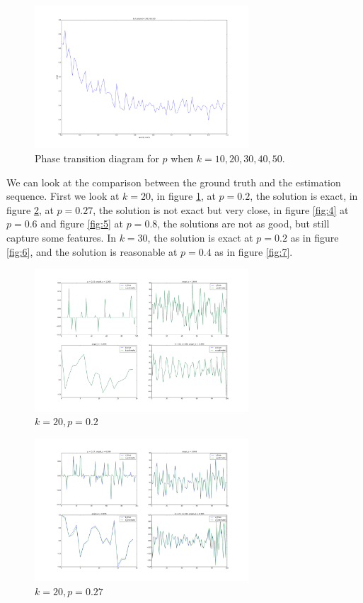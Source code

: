\documentclass[letter, 10pt]{article}
\numberwithin{equation}{section}
\begin{document}
\begin{figure}
\includegraphics[width=8cm,keepaspectratio]{fig2/w_Norm_x_BerNorm_A_none_n100_k50_p__sigma0_00.png}
\caption{ Phase transition diagram for $p$ when $k=10, 20, 30, 40, 50$. }
\end{figure}

We can look at the comparison between the ground truth and the estimation sequence.  First we look at $k=20$, in figure \ref{fig:2}, at $p=0.2$,  the solution is exact, in figure \ref{fig:3}, at $p=0.27$, the solution is not exact but very close, in figure \ref{fig:4} at $p=0.6$ and figure \ref{fig:5} at $p=0.8$, the solutions are not as good, but still capture some features. 
In $k=30$, the solution is exact at $p=0.2$ as in figure \ref{fig:6}, and the solution is reasonable at $p=0.4$ as in figure \ref{fig:7}. 

\begin{figure}
\centering 
\label{fig:2}
\includegraphics[width=8cm,keepaspectratio]{fig2/04_bShort_k_40_len_xSparse_w_Gaus_AGauss_n100_k20_p0_20_sigma0_00.png}
\caption{$k=20, p=0.2$}
\end{figure}

\begin{figure}
\centering 
\label{fig:3}
 \includegraphics[width=8cm,keepaspectratio]{fig2/04_bShort_k_40_len_xSparse_w_Gaus_AGauss_n100_k20_p0_27_sigma0_00.png}
\caption{$k=20, p=0.27$}
\end{figure}
\end{document}
